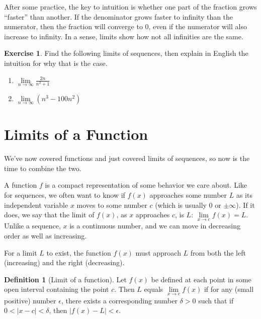\documentclass[
]{book}
\providecommand{\tightlist}{%
  \setlength{\itemsep}{0pt}\setlength{\parskip}{0pt}}
\theoremstyle{definition}
\newtheorem{definition}{Definition}[chapter]
\theoremstyle{definition}
\theoremstyle{definition}
\newtheorem{exercise}{Exercise}[chapter]
\theoremstyle{definition}
\theoremstyle{remark}
\begin{document}
After some practice, the key to intuition is whether one part of the fraction grows ``faster'' than another. If the denominator grows faster to infinity than the numerator, then the fraction will converge to 0, even if the numerator will also increase to infinity. In a sense, limits show how not all infinities are the same.

\begin{exercise}
\protect\hypertarget{exr:limseq2}{}{\label{exr:limseq2} }Find the following limits of sequences, then explain in English the intuition for why that is the case.

\begin{enumerate}
\def\labelenumi{\arabic{enumi}.}
\tightlist
\item
  \(\lim\limits_{n\to\infty} \frac{2n}{n^2 + 1}\)
\item
  \(\lim\limits_{n\to\infty} (n^3 - 100n^2)\)
\end{enumerate}
\end{exercise}

\hypertarget{limitsfun}{%
\section{Limits of a Function}\label{limitsfun}}

We've now covered functions and just covered limits of sequences, so now is the time to combine the two.

A function \(f\) is a compact representation of some behavior we care about. Like for sequences, we often want to know if \(f(x)\) approaches some number \(L\) as its independent variable \(x\) moves to some number \(c\) (which is usually 0 or \(\pm\infty\)). If it does, we say that the limit of \(f(x)\), as \(x\) approaches \(c\), is \(L\): \(\lim\limits_{x \to c} f(x)=L\). Unlike a sequence, \(x\) is a continuous number, and we can move in decreasing order as well as increasing.

For a limit \(L\) to exist, the function \(f(x)\) must approach \(L\) from both the left (increasing) and the right (decreasing).

\begin{definition}[Limit of a function]
\protect\hypertarget{def:unnamed-chunk-192}{}{\label{def:unnamed-chunk-192} {} }Let \(f(x)\) be defined at each point in some open interval containing the point \(c\). Then \(L\) equals \(\lim\limits_{x \to c} f(x)\) if for any (small positive) number \(\epsilon\), there exists a corresponding number \(\delta>0\) such that if \(0<|x-c|<\delta\), then \(|f(x)-L|<\epsilon\).
\end{definition}
\end{document}
